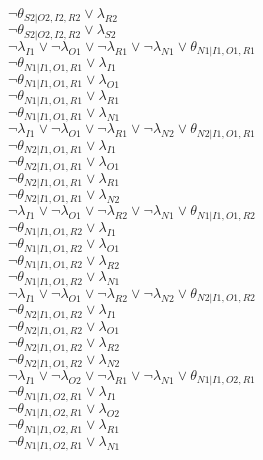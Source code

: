 $\neg\theta_{S2|O2,I2,R2} \vee \lambda_{R2}$\\
$\neg\theta_{S2|O2,I2,R2} \vee \lambda_{S2}$\\
$\neg\lambda_{I1} \vee \neg\lambda_{O1} \vee \neg\lambda_{R1} \vee \neg\lambda_{N1} \vee \theta_{N1|I1,O1,R1}$\\
$\neg\theta_{N1|I1,O1,R1} \vee \lambda_{I1}$\\
$\neg\theta_{N1|I1,O1,R1} \vee \lambda_{O1}$\\
$\neg\theta_{N1|I1,O1,R1} \vee \lambda_{R1}$\\
$\neg\theta_{N1|I1,O1,R1} \vee \lambda_{N1}$\\
$\neg\lambda_{I1} \vee \neg\lambda_{O1} \vee \neg\lambda_{R1} \vee \neg\lambda_{N2} \vee \theta_{N2|I1,O1,R1}$\\
$\neg\theta_{N2|I1,O1,R1} \vee \lambda_{I1}$\\
$\neg\theta_{N2|I1,O1,R1} \vee \lambda_{O1}$\\
$\neg\theta_{N2|I1,O1,R1} \vee \lambda_{R1}$\\
$\neg\theta_{N2|I1,O1,R1} \vee \lambda_{N2}$\\
$\neg\lambda_{I1} \vee \neg\lambda_{O1} \vee \neg\lambda_{R2} \vee \neg\lambda_{N1} \vee \theta_{N1|I1,O1,R2}$\\
$\neg\theta_{N1|I1,O1,R2} \vee \lambda_{I1}$\\
$\neg\theta_{N1|I1,O1,R2} \vee \lambda_{O1}$\\
$\neg\theta_{N1|I1,O1,R2} \vee \lambda_{R2}$\\
$\neg\theta_{N1|I1,O1,R2} \vee \lambda_{N1}$\\
$\neg\lambda_{I1} \vee \neg\lambda_{O1} \vee \neg\lambda_{R2} \vee \neg\lambda_{N2} \vee \theta_{N2|I1,O1,R2}$\\
$\neg\theta_{N2|I1,O1,R2} \vee \lambda_{I1}$\\
$\neg\theta_{N2|I1,O1,R2} \vee \lambda_{O1}$\\
$\neg\theta_{N2|I1,O1,R2} \vee \lambda_{R2}$\\
$\neg\theta_{N2|I1,O1,R2} \vee \lambda_{N2}$\\
$\neg\lambda_{I1} \vee \neg\lambda_{O2} \vee \neg\lambda_{R1} \vee \neg\lambda_{N1} \vee \theta_{N1|I1,O2,R1}$\\
$\neg\theta_{N1|I1,O2,R1} \vee \lambda_{I1}$\\
$\neg\theta_{N1|I1,O2,R1} \vee \lambda_{O2}$\\
$\neg\theta_{N1|I1,O2,R1} \vee \lambda_{R1}$\\
$\neg\theta_{N1|I1,O2,R1} \vee \lambda_{N1}$\\
